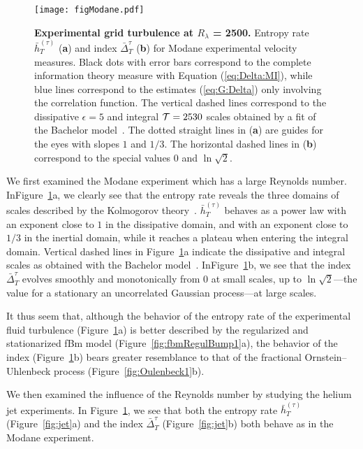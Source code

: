 \documentclass[aps,pra,groupedaddress,notitlepage]{revtex4-1}
\begin{document}
\begin{figure}[htb]
\texttt{[image: figModane.pdf]}
\caption{{\bf Experimental grid turbulence at $R_\lambda$ = 2500.} 
Entropy rate $\bar{h}_T^{(\tau)}$ (\textbf{a}) and index $\bar{\Delta}_T^{\tau}$ (\textbf{b}) for Modane experimental velocity measures. 
Black dots with error bars correspond to the complete information theory measure with Equation (\ref{eq:Delta:MI}), while blue lines correspond to the estimates (\ref{eq:G:Delta}) only involving the correlation function.
The vertical dashed lines correspond to the dissipative $\epsilon=5$ and integral ${\cal T}=2530$ scales obtained by a fit of the Bachelor model~\cite{Bachelor1951}. 
The dotted straight lines in (\textbf{a}) are guides for the eyes with slopes $1$ and $1/3$. 
The horizontal dashed lines in (\textbf{b}) correspond to the special values $0$ and $\ln\sqrt{2}$.
}
\label{fig:Modane}
\end{figure}

We first examined the Modane experiment which has a large Reynolds number.
In\linebreak Figure~\ref{fig:Modane}a, we clearly see that the entropy rate reveals the three domains of scales described by the Kolmogorov theory~\cite{Kolmogorov1991}. $\bar{h}_T^{(\tau)}$ behaves as a power law with an exponent close to $1$ in the dissipative domain, and with an exponent close to $1/3$ in the inertial domain, while it reaches a plateau when entering the integral domain. Vertical dashed lines in Figure~\ref{fig:Modane}a indicate the dissipative and integral scales as obtained with the Bachelor model~\cite{Bachelor1951}. In\linebreak Figure~\ref{fig:Modane}b, we see that the index $\bar{\Delta}_T^{\tau}$ evolves smoothly and monotonically from $0$ at small scales, up to $\ln\sqrt{2}$---the value for a stationary an uncorrelated Gaussian process---at large scales. 

It thus seem that, although the behavior of the entropy rate of the experimental fluid turbulence (Figure~\ref{fig:Modane}a) is better described by the regularized and stationarized fBm model (Figure~\ref{fig:fbmRegulBump1}a), the behavior of the index (Figure~\ref{fig:Modane}b) bears greater resemblance to that of the fractional Ornstein--Uhlenbeck process (Figure~\ref{fig:Oulenbeck1}b).



We then examined the influence of the Reynolds number by studying the helium jet experiments.
In Figure~\ref{fig:Modane}, we see that both the entropy rate $\bar{h}_T^{(\tau)}$ (Figure~\ref{fig:jet}a) and the index $\bar{\Delta}_T^{\tau}$ (Figure~\ref{fig:jet}b) both behave as in the Modane experiment. 
\end{document}
